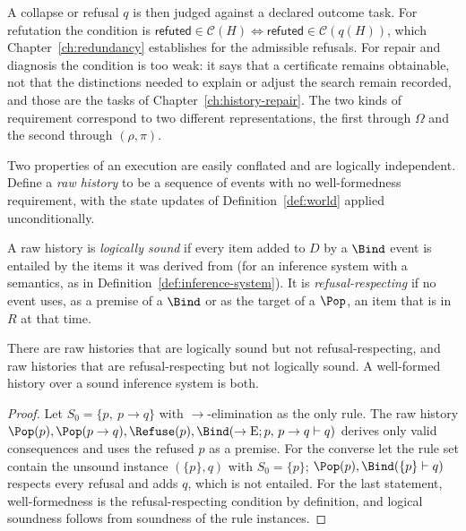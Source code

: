 A collapse or refusal $q$ is then judged against a declared outcome task. For refutation the condition is $\mathsf{refuted}\in\mathcal C(H)\iff\mathsf{refuted}\in\mathcal C(q(H))$, which Chapter~\ref{ch:redundancy} establishes for the admissible refusals. For repair and diagnosis the condition is too weak: it says that a certificate remains obtainable, not that the distinctions needed to explain or adjust the search remain recorded, and those are the tasks of Chapter~\ref{ch:history-repair}. The two kinds of requirement correspond to two different representations, the first through $\Omega$ and the second through $(\rho,\pi)$.

Two properties of an execution are easily conflated and are logically independent. Define a \emph{raw history} to be a sequence of events with no well-formedness requirement, with the state updates of Definition~\ref{def:world} applied unconditionally.

\begin{definition}
\label{def:two-guarantees}
A raw history is \emph{logically sound} if every item added to $D$ by a $\Bind$ event is entailed by the items it was derived from (for an inference system with a semantics, as in Definition~\ref{def:inference-system}). It is \emph{refusal-respecting} if no event uses, as a premise of a $\Bind$ or as the target of a $\Pop$, an item that is in $R$ at that time.
\end{definition}

\begin{proposition}[Independence]
\label{prop:two-guarantees}
There are raw histories that are logically sound but not refusal-respecting, and raw histories that are refusal-respecting but not logically sound. A well-formed history over a sound inference system is both.
\end{proposition}

\begin{proof}
Let $S_0=\{p,\ p\to q\}$ with $\to$-elimination as the only rule. The raw history $\Pop(p),\Pop(p\to q),\Refuse(p),\Bind(\to\mathrm{E};p,\,p\to q\vdash q)$ derives only valid consequences and uses the refused $p$ as a premise. For the converse let the rule set contain the unsound instance $(\{p\},q)$ with $S_0=\{p\}$; $\Pop(p),\Bind(\{p\}\vdash q)$ respects every refusal and adds $q$, which is not entailed. For the last statement, well-formedness is the refusal-respecting condition by definition, and logical soundness follows from soundness of the rule instances.
\end{proof}

